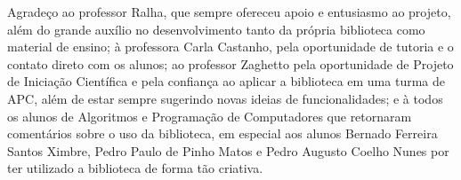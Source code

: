 Agradeço ao professor Ralha, que sempre ofereceu apoio e entusiasmo ao projeto, além do grande auxílio no desenvolvimento tanto da própria biblioteca como material de ensino; à professora Carla Castanho, pela oportunidade de tutoria e o contato direto com os alunos; ao professor Zaghetto pela oportunidade de Projeto de Iniciação Científica e pela confiança ao aplicar a biblioteca em uma turma de APC, além de estar sempre sugerindo novas ideias de funcionalidades; e à todos os alunos de Algoritmos e Programação de Computadores que retornaram comentários sobre o uso da biblioteca, em especial aos alunos Bernado Ferreira Santos Ximbre, Pedro Paulo de Pinho Matos e Pedro Augusto Coelho Nunes por ter utilizado a biblioteca de forma tão criativa.
